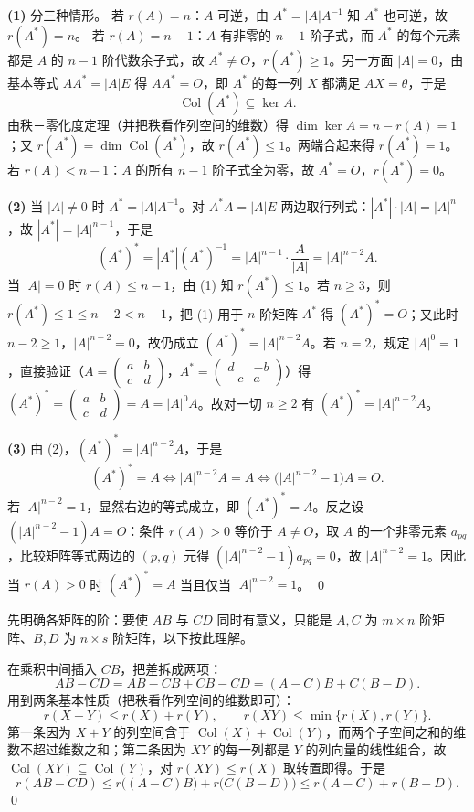 \begin{solution}
\textbf{(1)} 分三种情形。
若 $r(A)=n$：$A$ 可逆，由 $A^{*}=|A|A^{-1}$ 知 $A^{*}$ 也可逆，故 $r(A^{*})=n$。
若 $r(A)=n-1$：$A$ 有非零的 $n-1$ 阶子式，而 $A^{*}$ 的每个元素都是 $A$ 的 $n-1$ 阶代数余子式，故 $A^{*}\ne O$，$r(A^{*})\ge1$。另一方面 $|A|=0$，由基本等式 $AA^{*}=|A|E$ 得 $AA^{*}=O$，即 $A^{*}$ 的每一列 $X$ 都满足 $AX=\theta$，于是
\[
\operatorname{Col}(A^{*})\subseteq\ker A .
\]
由秩－零化度定理（并把秩看作列空间的维数）得 $\dim\ker A=n-r(A)=1$；又 $r(A^{*})=\dim\operatorname{Col}(A^{*})$，故 $r(A^{*})\le1$。两端合起来得 $r(A^{*})=1$。
若 $r(A)<n-1$：$A$ 的所有 $n-1$ 阶子式全为零，故 $A^{*}=O$，$r(A^{*})=0$。

\textbf{(2)} 当 $|A|\ne0$ 时 $A^{*}=|A|A^{-1}$。对 $A^{*}A=|A|E$ 两边取行列式：$|A^{*}|\cdot|A|=|A|^{n}$，故 $|A^{*}|=|A|^{n-1}$，于是
\[
(A^{*})^{*}=|A^{*}|(A^{*})^{-1}=|A|^{n-1}\cdot\frac{A}{|A|}=|A|^{n-2}A .
\]
当 $|A|=0$ 时 $r(A)\le n-1$，由 (1) 知 $r(A^{*})\le1$。若 $n\ge3$，则 $r(A^{*})\le1\le n-2<n-1$，把 (1) 用于 $n$ 阶矩阵 $A^{*}$ 得 $(A^{*})^{*}=O$；又此时 $n-2\ge1$，$|A|^{n-2}=0$，故仍成立 $(A^{*})^{*}=|A|^{n-2}A$。若 $n=2$，规定 $|A|^{0}=1$，直接验证（$A=\begin{pmatrix}a&b\\c&d\end{pmatrix}$，$A^{*}=\begin{pmatrix}d&-b\\-c&a\end{pmatrix}$）得 $(A^{*})^{*}=\begin{pmatrix}a&b\\c&d\end{pmatrix}=A=|A|^{0}A$。故对一切 $n\ge2$ 有 $(A^{*})^{*}=|A|^{n-2}A$。

\textbf{(3)} 由 (2)，$(A^{*})^{*}=|A|^{n-2}A$，于是
\[
(A^{*})^{*}=A\iff|A|^{n-2}A=A\iff\bigl(|A|^{n-2}-1\bigr)A=O .
\]
若 $|A|^{n-2}=1$，显然右边的等式成立，即 $(A^{*})^{*}=A$。反之设 $(|A|^{n-2}-1)A=O$：条件 $r(A)>0$ 等价于 $A\ne O$，取 $A$ 的一个非零元素 $a_{pq}$，比较矩阵等式两边的 $(p,q)$ 元得 $(|A|^{n-2}-1)a_{pq}=0$，故 $|A|^{n-2}=1$。因此当 $r(A)>0$ 时 $(A^{*})^{*}=A$ 当且仅当 $|A|^{n-2}=1$。
\qed
\end{solution}

\begin{solution}
先明确各矩阵的阶：要使 $AB$ 与 $CD$ 同时有意义，只能是 $A,C$ 为 $m\times n$ 阶矩阵、$B,D$ 为 $n\times s$ 阶矩阵，以下按此理解。

在乘积中间插入 $CB$，把差拆成两项：
\[
AB-CD=AB-CB+CB-CD=(A-C)B+C(B-D).
\]
用到两条基本性质（把秩看作列空间的维数即可）：
\[
r(X+Y)\le r(X)+r(Y),\qquad r(XY)\le\min\{r(X),r(Y)\}.
\]
第一条因为 $X+Y$ 的列空间含于 $\operatorname{Col}(X)+\operatorname{Col}(Y)$，而两个子空间之和的维数不超过维数之和；第二条因为 $XY$ 的每一列都是 $Y$ 的列向量的线性组合，故 $\operatorname{Col}(XY)\subseteq\operatorname{Col}(Y)$，对 $r(XY)\le r(X)$ 取转置即得。于是
\[
r(AB-CD)\le r\bigl((A-C)B\bigr)+r\bigl(C(B-D)\bigr)\le r(A-C)+r(B-D).
\]
\qed
{}
\end{solution}


